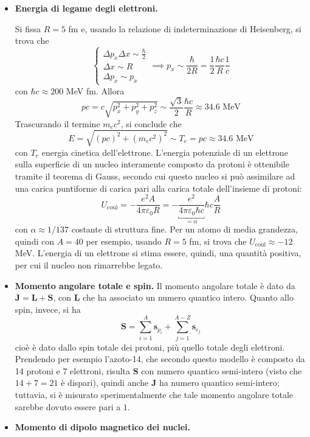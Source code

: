 \documentclass[11pt, a4paper]{scrartcl}
\theoremstyle{style}
\numberwithin{equation}{subsection}
\begin{document}
\begin{itemize}
	\item \textbf{Energia di legame degli elettroni.} 

		Si fissa $R = 5$ fm e, usando la relazione di indeterminazione di Heisenberg, si trova che 
		\[
		\begin{cases}
			\Delta p_x \Delta x \sim \frac{\hbar }{2}\\
			\Delta x \sim R\\
			\Delta p_x \sim p_x
		\end{cases} \implies p_x \sim \frac{\hbar }{2R} = \frac{1}{2} \frac{\hbar c }{R} \frac{1}{c}
		\] 
		con $\hbar c \approx 200 $ MeV fm. 
		Allora
		\[
		p c = c \sqrt{p_x^2 + p_y^2 + p_z^2} \sim \frac{\sqrt{3} }{2} \frac{\hbar c}{R} \approx 34.6 \text{ MeV}
		\] 
		Trascurando il termine $m_e c^2$, si conclude che
		\[
		E = \sqrt{(pc)^2 + (m_e c^2)^2} \sim T_e = pc \approx 34.6 \text{ MeV}
		\] 
		con $T_e$ energia cinetica dell'elettrone.
		L'energia potenziale di un elettrone sulla superficie di un nucleo interamente composto da protoni \`e ottenibile tramite il teorema di Gauss, secondo cui questo nucleo si pu\`o assimilare ad una carica puntiforme di carica pari alla carica totale dell'insieme di protoni:
		\[
			U_\text{coul} = - \frac{e^2 A}{ 4\pi \varepsilon _0 R} = - \underbracket{\frac{e^2}{4 \pi \varepsilon _0  \hbar c}}_{= \alpha } \hbar c \frac{A}{R}
		\] 
	con $\alpha \approx 1 / 137$ costante di struttura fine.	
	Per un atomo di media grandezza, quindi con $A = 40$ per esempio, usando $R = 5$ fm, si trova che $U_\text{coul} \approx -12 $ MeV.
	L'energia di un elettrone si stima essere, quindi, una quantit\`a positiva, per cui il nucleo non rimarrebbe legato.
\item \textbf{Momento angolare totale e spin.} 
	Il momento angolare totale \`e dato da $\mathbf{J} = \mathbf{L}  + \mathbf{S} $, con $\mathbf{L} $ che ha associato un numero quantico intero.
	Quanto allo spin, invece, si ha 
	\[
	\mathbf{S}  = \sum_{i=1}^{A} \mathbf{s} _{p_i} + \sum_{j=1}^{A-Z} \mathbf{s} _{e_j}
	\] 
	cio\`e \`e dato dallo spin totale dei protoni, pi\`u quello totale degli elettroni.
	Prendendo per esempio l'azoto-14, che secondo questo modello \`e composto da 14 protoni e 7 elettroni, risulta $\mathbf{S} $ con numero quantico semi-intero (visto che $14 + 7 = 21$ \`e dispari), quindi anche $\mathbf{J} $ ha numero quantico semi-intero; tuttavia, si \`e misurato sperimentalmente che tale momento angolare totale sarebbe dovuto essere pari a $1$.
\item \textbf{Momento di dipolo magnetico dei nuclei.} 


\end{itemize}
\end{document}
